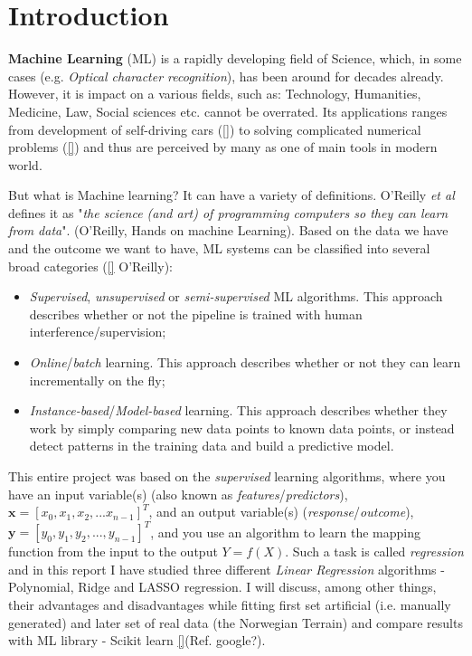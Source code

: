 \section{Introduction}
\label{introduction}






\textbf{Machine Learning} (ML) is a rapidly developing field of Science, which, in some cases (e.g. \textit{Optical character recognition}), has been around for decades already. However, it is impact on a various fields, such as: Technology, Humanities, Medicine, Law, Social sciences etc. cannot be overrated. Its applications ranges from development of self-driving cars (\ref{}) to solving complicated numerical problems (\ref{}) and thus are perceived by many as one of main tools in modern world. 

But what is Machine learning? It can have a variety of definitions. O'Reilly \textit{et al} defines it as "\textit{the science (and art) of programming computers so they can learn from data}". (O'Reilly, Hands on machine Learning). Based on the data we have and the outcome we want to have, ML systems can be classified into several broad categories (\ref{} O'Reilly): 
\begin{itemize}
    \item \textit{Supervised}, \textit{unsupervised} or \textit{semi-supervised} ML algorithms. This approach describes whether or not the pipeline is trained with human interference/supervision; 
    \item \textit{Online}/\textit{batch} learning. This approach describes whether or not they can learn incrementally on the fly;
    \item \textit{Instance-based}/\textit{Model-based} learning. This approach describes whether they work by simply comparing new data points to known data points, or instead detect patterns in the training data and build a predictive model.
\end{itemize}

This entire project was based on the \textit{supervised} learning algorithms, where you have an input variable(s) (also known as \textit{features}/\textit{predictors}), $\bm{x}=[x_0, x_1, x_2,...x_{n-1}]^T$, and an output variable(s) (\textit{response}/\textit{outcome}), $\bm{y}=[y_0, y_1, y_2,...,y_{n-1}]^T$, and you use an algorithm to learn the mapping function from the input to the output $Y = f(X)$. Such a task is called \textit{regression} and in this report I have studied three different \textit{Linear Regression} algorithms - Polynomial, Ridge and LASSO regression. I will discuss, among other things, their advantages and disadvantages while fitting first set artificial (i.e. manually generated) and later set of real data (the Norwegian Terrain) and compare results with ML library - Scikit learn \ref{}(Ref. google?).

